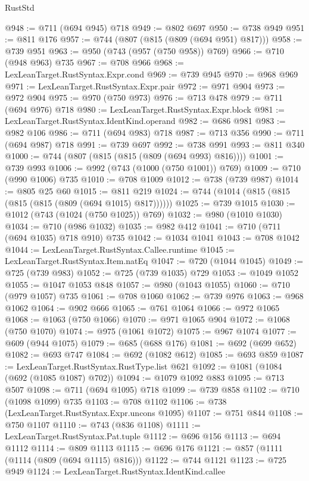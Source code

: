 \begin{lexlean}{RustStd}
\begin{coremodule}
@948 := @711 (@694 @945) @718
@949 := @802 @697
@950 := @738 @949
@951 := @811 @176
@957 := @744 (@807 (@815 (@809 (@694 @951) @817)))
@958 := @739 @951
@963 := @950 (@743 (@957 (@750 @958)) @769)
@966 := @710 (@948 @963) @735
@967 := @708 @966
@968 := LexLeanTarget.RustSyntax.Expr.cond
@969 := @739 @945
@970 := @968 @969
@971 := LexLeanTarget.RustSyntax.Expr.pair
@972 := @971 @904
@973 := @972 @904
@975 := @970 (@750 @973)
@976 := @713 @478
@979 := @711 (@694 @976) @718
@980 := LexLeanTarget.RustSyntax.Expr.block
@981 := LexLeanTarget.RustSyntax.IdentKind.operand
@982 := @686 @981
@983 := @982 @106
@986 := @711 (@694 @983) @718
@987 := @713 @356
@990 := @711 (@694 @987) @718
@991 := @739 @697
@992 := @738 @991
@993 := @811 @340
@1000 := @744 (@807 (@815 (@815 (@809 (@694 @993) @816))))
@1001 := @739 @993
@1006 := @992 (@743 (@1000 (@750 @1001)) @769)
@1009 := @710 (@990 @1006) @735
@1010 := @708 @1009
@1012 := @738 (@739 @987)
@1014 := @805 @25 @60
@1015 := @811 @219
@1024 := @744 (@1014 (@815 (@815 (@815 (@815 (@809 (@694 @1015) @817))))))
@1025 := @739 @1015
@1030 := @1012 (@743 (@1024 (@750 @1025)) @769)
@1032 := @980 (@1010 @1030)
@1034 := @710 (@986 @1032)
@1035 := @982 @412
@1041 := @710 (@711 (@694 @1035) @718 @910) @735
@1042 := @1034 @1041
@1043 := @708 @1042
@1044 := LexLeanTarget.RustSyntax.Callee.runtime
@1045 := LexLeanTarget.RustSyntax.Item.natEq
@1047 := @720 (@1044 @1045)
@1049 := @725 (@739 @983)
@1052 := @725 (@739 @1035) @729
@1053 := @1049 @1052
@1055 := @1047 @1053 @848
@1057 := @980 (@1043 @1055)
@1060 := @710 (@979 @1057) @735
@1061 := @708 @1060
@1062 := @739 @976
@1063 := @968 @1062
@1064 := @902 @666
@1065 := @761 @1064
@1066 := @972 @1065
@1068 := @1063 (@750 @1066)
@1070 := @971 @1065 @904
@1072 := @1068 (@750 @1070)
@1074 := @975 (@1061 @1072)
@1075 := @967 @1074
@1077 := @609 (@944 @1075)
@1079 := @685 (@688 @176)
@1081 := @692 (@699 @652)
@1082 := @693 @747
@1084 := @692 (@1082 @612)
@1085 := @693 @859
@1087 := LexLeanTarget.RustSyntax.RustType.list @621
@1092 := @1081 (@1084 (@692 (@1085 @1087) @702))
@1094 := @1079 @1092 @883
@1095 := @713 @507
@1098 := @711 (@694 @1095) @718
@1099 := @739 @858
@1102 := @710 (@1098 @1099) @735
@1103 := @708 @1102
@1106 := @738 (LexLeanTarget.RustSyntax.Expr.uncons @1095)
@1107 := @751 @844
@1108 := @750 @1107
@1110 := @743 (@836 @1108)
@1111 := LexLeanTarget.RustSyntax.Pat.tuple
@1112 := @696 @156
@1113 := @694 @1112
@1114 := @809 @1113
@1115 := @696 @176
@1121 := @857 (@1111 (@1114 (@809 (@694 @1115) @816)))
@1122 := @744 @1121
@1123 := @725 @949
@1124 := LexLeanTarget.RustSyntax.IdentKind.callee

\end{coremodule}
\end{lexlean}
